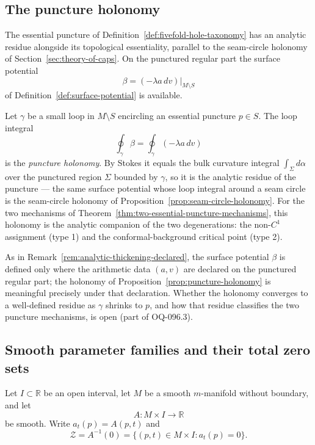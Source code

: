 \subsection{The puncture holonomy}

The essential puncture of Definition~\ref{def:fivefold-hole-taxonomy} has an
analytic residue alongside its topological essentiality, parallel to the
seam-circle holonomy of Section~\ref{sec:theory-of-caps}.  On the punctured
regular part the surface potential
\[
  \beta=(-\lambda a\,dv)\big|_{M\setminus S}
\]
of Definition~\ref{def:surface-potential} is available.

\begin{proposition}
\label{prop:puncture-holonomy}
Let $\gamma$ be a small loop in $M\setminus S$ encircling an essential puncture
$p\in S$.  The loop integral
\[
  \oint_\gamma\beta=\oint_\gamma(-\lambda a\,dv)
\]
is the \emph{puncture holonomy}.  By Stokes it equals the bulk curvature integral
$\int_\Sigma d\alpha$ over the punctured region $\Sigma$ bounded by $\gamma$, so
it is the analytic residue of the puncture --- the same surface potential whose
loop integral around a seam circle is the seam-circle holonomy of
Proposition~\ref{prop:seam-circle-holonomy}.  For the two mechanisms of
Theorem~\ref{thm:two-essential-puncture-mechanisms}, this holonomy is the
analytic companion of the two degenerations: the non-$C^1$ assignment (type 1)
and the conformal-background critical point (type 2).
\end{proposition}

\begin{remark}
\label{rem:puncture-holonomy-declared}
As in Remark~\ref{rem:analytic-thickening-declared}, the surface potential
$\beta$ is defined only where the arithmetic data $(a,v)$ are declared on the
punctured regular part; the holonomy of
Proposition~\ref{prop:puncture-holonomy} is meaningful precisely under that
declaration.  Whether the holonomy converges to a well-defined residue as
$\gamma$ shrinks to $p$, and how that residue classifies the two puncture
mechanisms, is open (part of OQ-096.3).
\end{remark}

\subsection{Smooth parameter families and their total zero sets}

Let \(I\subset\mathbb R\) be an open interval, let \(M\) be a smooth
\(m\)-manifold without boundary, and let
\[
 A:M\times I\longrightarrow\mathbb R
\]
be smooth.  Write \(a_t(p)=A(p,t)\) and
\[
 \mathcal Z=A^{-1}(0)
 =\{(p,t)\in M\times I:a_t(p)=0\}.
\]

